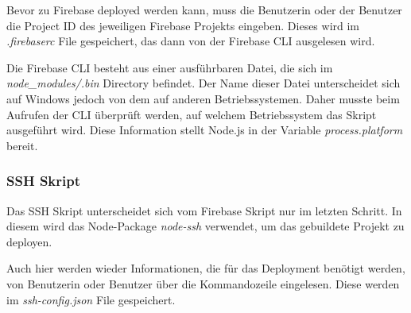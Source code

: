 Bevor zu Firebase deployed werden kann, muss die Benutzerin oder der Benutzer die Project ID des jeweiligen
Firebase Projekts eingeben.
Dieses wird im \textit{.firebaserc} File gespeichert, das dann von der Firebase CLI ausgelesen wird.

Die Firebase CLI besteht aus einer ausführbaren Datei, die sich im \textit{node\_modules/.bin} Directory befindet.
Der Name dieser Datei unterscheidet sich auf Windows jedoch von dem auf anderen Betriebssystemen.
Daher musste beim Aufrufen der CLI überprüft werden, auf welchem Betriebssystem das Skript ausgeführt wird.
Diese Information stellt Node.js in der Variable \textit{process.platform} bereit.

\subsubsection{SSH Skript}
Das SSH Skript unterscheidet sich vom Firebase Skript nur im letzten Schritt.
In diesem wird das Node-Package \textit{node-ssh} verwendet, um das gebuildete Projekt zu deployen.

Auch hier werden wieder Informationen, die für das Deployment benötigt werden, von Benutzerin oder Benutzer über
die Kommandozeile eingelesen.
Diese werden im \textit{ssh-config.json} File gespeichert.

